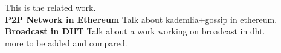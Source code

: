 This is the related work. \\

\noindent
\textbf{P2P Network in Ethereum} Talk about kademlia+gossip in ethereum.\\
\noindent
\textbf{Broadcast in DHT} Talk about a work working on broadcast in dht.
\\
more to be added and compared.